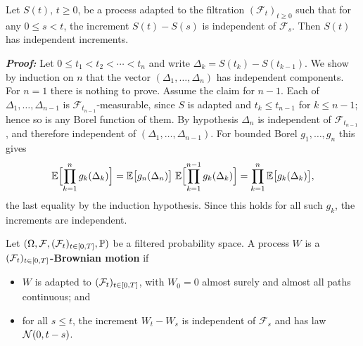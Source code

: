 
\begin{proposition} \label{prop:independent-increments}
Let \(S(t), \, t \geq 0\), be a process adapted to the filtration 
\((\mathcal{F}_t)_{t \geq 0}\) such that for any \(0 \leq s < t\),
the increment \(S(t)-S(s)\) is independent of \(\mathcal{F}_s\). 
Then \(S(t)\) has independent increments.
\end{proposition}

\textbf{\textit{Proof:}} Let $0 \leq t_1 < t_2 < \cdots < t_n$ and write
$\Delta_k = S(t_k) - S(t_{k-1})$. We show by induction on $n$ that the vector
$(\Delta_1,\dots,\Delta_n)$ has independent components. For $n=1$ there is nothing to prove.
Assume the claim for $n-1$. Each of $\Delta_1, \dots, \Delta_{n-1}$ is
$\mathcal{F}_{t_{n-1}}$-measurable, since $S$ is adapted and $t_k \leq t_{n-1}$ for $k \leq n-1$;
hence so is any Borel function of them. By hypothesis $\Delta_n$ is independent of
$\mathcal{F}_{t_{n-1}}$, and therefore independent of $(\Delta_1,\dots,\Delta_{n-1})$. For bounded
Borel $g_1,\dots,g_n$ this gives
\[
\mathbb{E}\Bigl[\prod_{k=1}^n g_k(\Delta_k)\Bigr]
= \mathbb{E}\bigl[g_n(\Delta_n)\bigr]\;\mathbb{E}\Bigl[\prod_{k=1}^{n-1} g_k(\Delta_k)\Bigr]
= \prod_{k=1}^n \mathbb{E}\bigl[g_k(\Delta_k)\bigr],
\]
the last equality by the induction hypothesis. Since this holds for all such $g_k$, the increments
are independent. \qedfilledtext

\medskip


\begin{definition}\label{def:filtbm}
Let $(\Omega,\mathcal{F},(\mathcal{F}_t)_{t\in[0,T]},\mathbb{P})$ be a filtered probability space. A process $W$ is a 
\textbf{$(\mathcal{F}_t)_{t\in[0,T]}$-Brownian motion} if
\begin{itemize}
    \item[i)] $W$ is adapted to $(\mathcal{F}_t)_{t\in[0,T]}$, with $W_0 = 0$ almost surely and almost all paths continuous; and
    \item[ii)] for all $s \leq t$, the increment $W_t - W_s$ is independent of $\mathcal{F}_s$ and has law $\mathcal{N}(0,t-s)$.
\end{itemize}
\end{definition}


